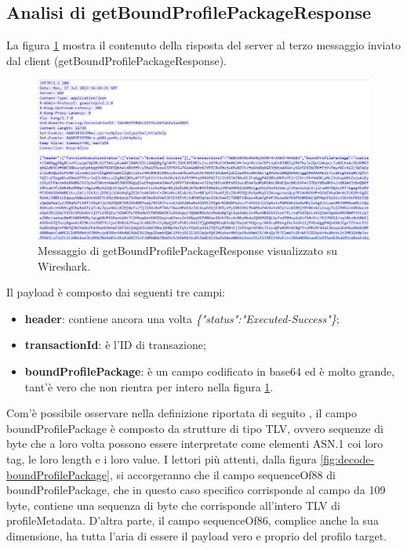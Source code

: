 \documentclass[10pt, oneside]{book}
\begin{document}
\subsection{Analisi di getBoundProfilePackageResponse}
La figura \ref{fig:msg6-stream-pcap} mostra il contenuto della risposta del server al terzo messaggio inviato dal client (getBoundProfilePackageResponse).\\
\begin{figure}
\includegraphics[width=\linewidth]{msg6-stream-pcap.png}
\caption{Messaggio di getBoundProfilePackageResponse visualizzato su Wireshark.}
\label{fig:msg6-stream-pcap}
\end{figure}
Il payload è composto dai seguenti tre campi:
\begin{itemize}
\item \textbf{header}: contiene ancora una volta \textit{\{"status":"Executed-Success"\}};
\item \textbf{transactionId}: è l'ID di transazione;
\item \textbf{boundProfilePackage}: è un campo codificato in base64 ed è molto grande, tant'è vero che non rientra per intero nella figura \ref{fig:msg6-stream-pcap}.
\end{itemize}
Com'è possibile osservare nella definizione riportata di seguito \cite{RSP-definitions}, il campo boundProfilePackage è composto da strutture di tipo TLV, ovvero sequenze di byte che a loro volta possono essere interpretate come elementi ASN.1 coi loro tag, le loro length e i loro value. I lettori più attenti, dalla figura \ref{fig:decode-boundProfilePackage}, si accorgeranno che il campo sequenceOf88 di boundProfilePackage, che in questo caso specifico corrisponde al campo da 109 byte, contiene una sequenza di byte che corrisponde all'intero TLV di profileMetadata. D'altra parte, il campo sequenceOf86, complice anche la sua dimensione, ha tutta l'aria di essere il payload vero e proprio del profilo target.\\
\end{document}
